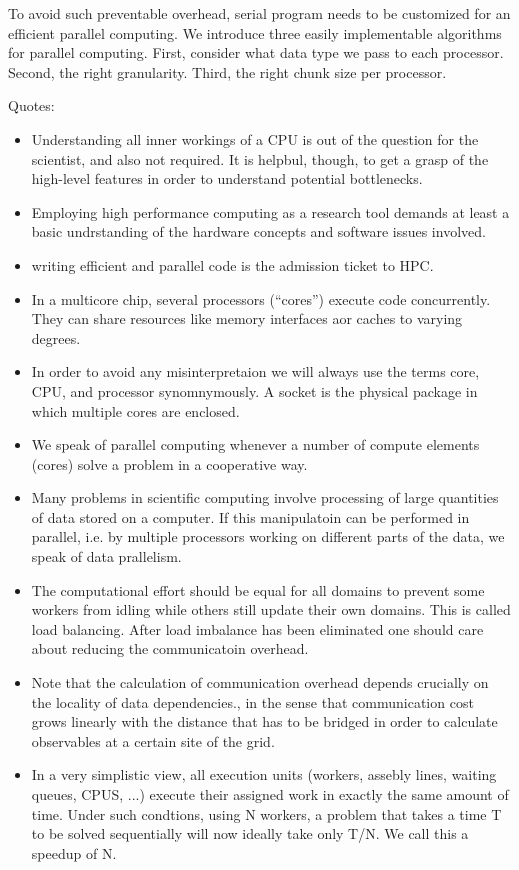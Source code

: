 \documentclass[12pt]{article}
\begin{document}
To avoid such preventable overhead, serial program needs to be customized for an efficient parallel computing. We introduce three easily implementable algorithms for parallel computing. First, consider what data type we pass to each processor. Second, the right granularity. Third, the right chunk size per processor.


Quotes:
\begin{itemize}
\item Understanding all inner workings of a CPU is out of the question for the scientist, and also not required. It is helpbul, though, to get a grasp of the high-level features in order to understand potential bottlenecks.
\item Employing high performance  computing as a research tool demands at least a basic undrstanding of the hardware concepts and software issues involved.
\item writing efficient and parallel code is the admission ticket to HPC.
\item In a multicore chip, several processors (``cores'') execute code concurrently. They can share resources like memory interfaces aor caches to varying degrees.
\item In order to avoid any misinterpretaion we will always use the terms core, CPU, and processor synomnymously. A socket is the physical package in which multiple cores are enclosed.
\item We speak of parallel computing whenever a number of compute elements (cores) solve a problem in a cooperative way.
\item Many problems in scientific computing involve processing of large quantities of data stored on a computer. If this manipulatoin can be performed in parallel, i.e. by multiple processors working on different parts of the data, we speak of data prallelism.
\item The computational effort should be equal for all domains to prevent some workers from idling while others still update their own domains. This is called load balancing. After load imbalance has been eliminated one should care about reducing the communicatoin overhead.
\item Note that the calculation of communication overhead depends crucially on the locality of data dependencies., in the sense that communication cost grows linearly with the distance that has to be bridged in order to calculate observables at a certain site of the grid.
\item In a very simplistic view, all execution units (workers, assebly lines, waiting queues, CPUS, ...) execute their assigned work in exactly the same amount of time. Under such condtions, using N workers, a problem that takes a time T to be solved sequentially will now ideally take only T/N. We call this a speedup of N.

\end{itemize}
\end{document}
